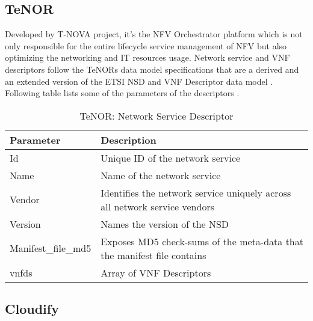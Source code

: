 \subsection{TeNOR}
Developed by T-NOVA project, it's the NFV Orchestrator platform which is not only responsible for the entire lifecycle service management of NFV but also optimizing the networking and IT resources usage. Network service and VNF descriptors follow the TeNORs data model specifications that are a derived and an extended version of the ETSI NSD and VNF Descriptor data model \cite{de2018network}. Following table lists some of the parameters of the descriptors \cite{TeNorSchemaDocumentation}.
    \begin{table}[h]
        \centering
    \begin{tabular}{ |p{4cm}|p{10cm}|}
        \hline
        \textbf{Parameter} & \textbf{Description} \\
        \hline
         
         Id & Unique ID of the network service \\
         \hline
         Name & Name of the network service \\
         \hline
         Vendor & Identifies the network service uniquely across all network service vendors \\
         \hline
         Version &  Names the version of the NSD \\
         \hline
         Manifest\_file\_md5 & Exposes MD5 check-sums of the meta-data that the manifest file contains \\
         \hline
         vnfds & Array of VNF Descriptors \\
         \hline
    \end{tabular}
        \caption{TeNOR: Network Service Descriptor}
    \label{tab:TeNOR_NSD_section}
 \end{table}
\newpage
\subsection{Cloudify}
